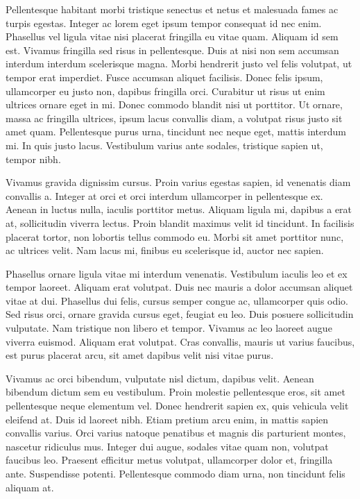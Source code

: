 \documentclass{article}
\begin{document}
Pellentesque habitant morbi tristique senectus et netus et malesuada fames ac turpis egestas. Integer ac lorem eget ipsum tempor consequat id nec enim. Phasellus vel ligula vitae nisi placerat fringilla eu vitae quam. Aliquam id sem est. Vivamus fringilla sed risus in pellentesque. Duis at nisi non sem accumsan interdum interdum scelerisque magna. Morbi hendrerit justo vel felis volutpat, ut tempor erat imperdiet. Fusce accumsan aliquet facilisis. Donec felis ipsum, ullamcorper eu justo non, dapibus fringilla orci. Curabitur ut risus ut enim ultrices ornare eget in mi. Donec commodo blandit nisi ut porttitor. Ut ornare, massa ac fringilla ultrices, ipsum lacus convallis diam, a volutpat risus justo sit amet quam. Pellentesque purus urna, tincidunt nec neque eget, mattis interdum mi. In quis justo lacus. Vestibulum varius ante sodales, tristique sapien ut, tempor nibh.

Vivamus gravida dignissim cursus. Proin varius egestas sapien, id venenatis diam convallis a. Integer at orci et orci interdum ullamcorper in pellentesque ex. Aenean in luctus nulla, iaculis porttitor metus. Aliquam ligula mi, dapibus a erat at, sollicitudin viverra lectus. Proin blandit maximus velit id tincidunt. In facilisis placerat tortor, non lobortis tellus commodo eu. Morbi sit amet porttitor nunc, ac ultrices velit. Nam lacus mi, finibus eu scelerisque id, auctor nec sapien.

Phasellus ornare ligula vitae mi interdum venenatis. Vestibulum iaculis leo et ex tempor laoreet. Aliquam erat volutpat. Duis nec mauris a dolor accumsan aliquet vitae at dui. Phasellus dui felis, cursus semper congue ac, ullamcorper quis odio. Sed risus orci, ornare gravida cursus eget, feugiat eu leo. Duis posuere sollicitudin vulputate. Nam tristique non libero et tempor. Vivamus ac leo laoreet augue viverra euismod. Aliquam erat volutpat. Cras convallis, mauris ut varius faucibus, est purus placerat arcu, sit amet dapibus velit nisi vitae purus.

Vivamus ac orci bibendum, vulputate nisl dictum, dapibus velit. Aenean bibendum dictum sem eu vestibulum. Proin molestie pellentesque eros, sit amet pellentesque neque elementum vel. Donec hendrerit sapien ex, quis vehicula velit eleifend at. Duis id laoreet nibh. Etiam pretium arcu enim, in mattis sapien convallis varius. Orci varius natoque penatibus et magnis dis parturient montes, nascetur ridiculus mus. Integer dui augue, sodales vitae quam non, volutpat faucibus leo. Praesent efficitur metus volutpat, ullamcorper dolor et, fringilla ante. Suspendisse potenti. Pellentesque commodo diam urna, non tincidunt felis aliquam at.
\end{document}

